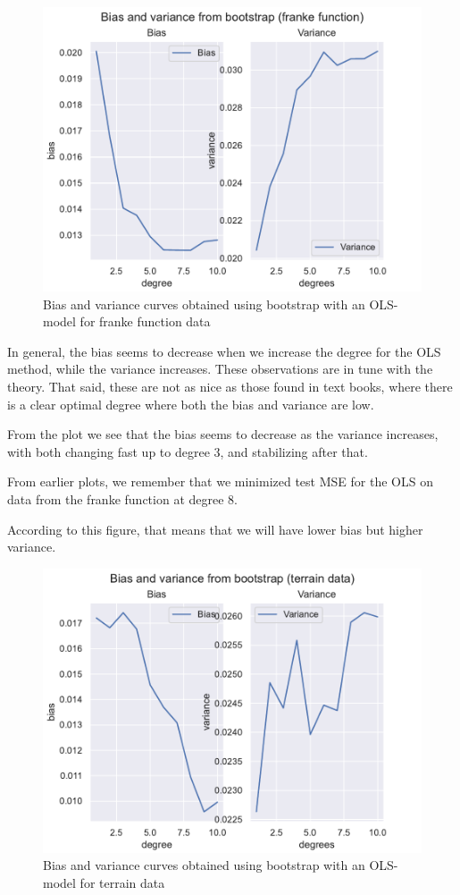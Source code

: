 \documentclass[12pt]{article}
\begin{document}
\begin{figure}[H]
    \centering
    \includegraphics[width=0.8\columnwidth]{../src/output/bootstrap_bias_variance_franke_function.pdf}
    \caption{Bias and variance curves obtained using bootstrap with an OLS-model for franke function data}
    \label{fig:franke_bias_variance_bootstrap}
\end{figure}

In general, the bias seems to decrease when we increase the degree for the OLS method, while the variance increases.
These observations are in tune with the theory.
That said, these are not as nice as those found in text books, where there is a clear optimal degree where both the bias and variance are low.

From the plot we see that the bias seems to decrease as the variance increases, with both changing fast up to degree 3, and stabilizing after that.

From earlier plots, we remember that we minimized test MSE for the OLS on data from the franke function at degree 8.

According to this figure, that means that we will have lower bias but higher variance.

\begin{figure}[H]
    \centering
    \includegraphics[width=0.8\columnwidth]{../src/output/bootstrap_bias_variance_terrain_data.pdf}
    \caption{Bias and variance curves obtained using bootstrap with an OLS-model for terrain data}
    \label{fig:terrain_bias_variance_bootstrap}
\end{figure}
\end{document}

